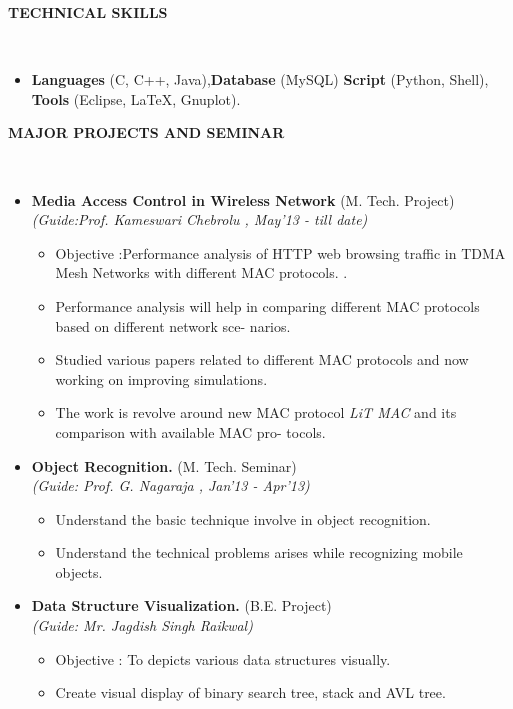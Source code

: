 \documentclass[a4paper,10pt]{article}
\newcommand{\isep}{-2 pt}
\newcommand{\lsep}{-0.5cm}
\newcommand{\resheading}[1]{{\small \colorbox{mygrey}{\begin{minipage}{0.975\textwidth}{\textbf{#1 \vphantom{p\^{E}}}}\end{minipage}}}}
\begin{document}
\resheading{\textbf{TECHNICAL SKILLS} }\\[\lsep]
\begin{itemize}
\item \noindent \textbf{Languages} (C, C++, Java),\textbf{Database} (MySQL) \textbf{Script} (Python, Shell), \textbf{Tools} (Eclipse, \LaTeX, Gnuplot).
\end{itemize}

\resheading{\textbf{MAJOR PROJECTS AND SEMINAR} }\\[\lsep]
\begin{itemize}
\item \textbf{Media Access Control in Wireless Network
} (M. Tech. Project) \\
 \emph{(Guide:Prof. Kameswari Chebrolu
, May'13 - till date)} \\[-0.6cm]
	\begin{itemize}\itemsep \isep
	\item Objective :Performance analysis of HTTP web browsing traffic in TDMA Mesh Networks with different
MAC protocols.
.
	\item Performance analysis will help in comparing different MAC protocols based on different network sce-
narios.

	\item Studied various papers related to different MAC protocols and now working on improving simulations.

	\item The work is revolve around new MAC protocol \emph{LiT MAC} and its comparison with available MAC pro-
tocols.

	\end{itemize}

\item \textbf{Object Recognition.
} (M. Tech. Seminar) \\
 \emph{(Guide: Prof. G. Nagaraja
, Jan'13 - Apr'13)} \\[-0.6cm]
	\begin{itemize}\itemsep \isep
	\item Understand the basic technique involve in object recognition.
	\item Understand the technical problems arises while recognizing mobile objects.
	\end{itemize}

\item \textbf{Data Structure Visualization.} (B.E. Project) \\ 
 \emph{(Guide: Mr. Jagdish Singh Raikwal)} 
 \\[-0.6cm]
	\begin{itemize}\itemsep \isep
	\item Objective : To depicts various data structures visually.
	\item Create visual display of binary search tree, stack and AVL tree.
	\end{itemize}
\end{itemize}
\end{document}
